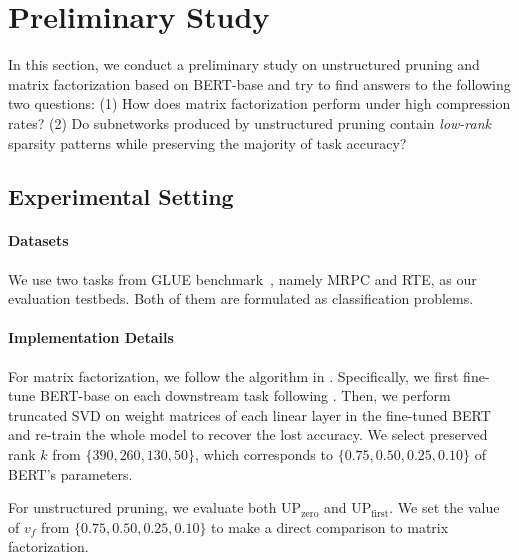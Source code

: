 
 


\section{Preliminary Study}
\label{sec:pilot}
In this section, we conduct a preliminary study on unstructured pruning  and matrix factorization
based on BERT-base and try to find answers to the following two questions: (1) How does matrix factorization perform under high compression rates? (2) Do subnetworks produced by unstructured pruning contain \textit{low-rank} sparsity patterns while preserving the majority of task accuracy?

\subsection{Experimental Setting}
\indent
\paragraph{Datasets}We use two tasks from GLUE benchmark~\cite{glue}, namely MRPC and RTE, as our evaluation testbeds. Both of them are formulated as classification problems.

\paragraph{Implementation Details} For matrix factorization, we follow the algorithm in . Specifically, we first fine-tune BERT-base on each downstream task following \citet{bert}. Then, we perform truncated SVD on weight matrices of each linear layer in the fine-tuned BERT and re-train the whole model to recover the lost accuracy. We select preserved rank $k$ from $\{390, 260, 130, 50\}$, which corresponds to $\{0.75, 0.50, 0.25, 0.10\}$ of BERT's parameters.

For unstructured  pruning, we evaluate both UP$_\text{zero}$ and UP$_\text{first}$. We set the value of $v_f$ from $\{0.75, 0.50, 0.25, 0.10\}$ to make a direct comparison to matrix factorization.

